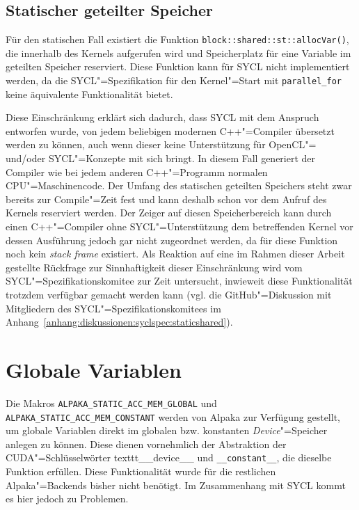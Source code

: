 \subsection{Statischer geteilter Speicher}

Für den statischen Fall existiert die Funktion
\texttt{block::shared::st::allocVar()}, die innerhalb des Kernels aufgerufen
wird und Speicherplatz für eine Variable im geteilten Speicher reserviert. Diese
Funktion kann für SYCL nicht implementiert werden, da die SYCL"=Spezifikation
für den Kernel"=Start mit \texttt{parallel\_for} keine äquivalente
Funktionalität bietet.

Diese Einschränkung erklärt sich dadurch, dass SYCL mit dem Anspruch entworfen
wurde, von jedem beliebigen modernen C++"=Compiler übersetzt werden zu können,
auch wenn dieser keine Unterstützung für OpenCL"= und/oder SYCL"=Konzepte mit
sich bringt. In diesem Fall generiert der Compiler wie bei jedem anderen
C++"=Programm normalen CPU"=Maschinencode. Der Umfang des statischen geteilten
Speichers steht zwar bereits zur Compile"=Zeit fest und kann deshalb schon vor
dem Aufruf des Kernels reserviert werden. Der Zeiger auf diesen Speicherbereich
kann durch einen C++"=Compiler ohne SYCL"=Unterstützung dem betreffenden Kernel
vor dessen Ausführung jedoch gar nicht zugeordnet werden, da für diese Funktion
noch kein \textit{stack frame} existiert. Als Reaktion auf eine im Rahmen dieser
Arbeit gestellte Rückfrage zur Sinnhaftigkeit dieser Einschränkung wird vom
SYCL"=Spezifikationskomitee zur Zeit untersucht, inwieweit diese Funktionalität
trotzdem verfügbar gemacht werden kann (vgl. die GitHub"=Diskussion mit
Mitgliedern des SYCL"=Spezifikationskomitees im
Anhang~\ref{anhang:diskussionen:syclspec:staticshared}).

\section{Globale Variablen}\label{implementierung:globalvar}

Die Makros \texttt{ALPAKA\_STATIC\_ACC\_MEM\_GLOBAL} und
\texttt{ALPAKA\_STATIC\_ACC\_MEM\_CONSTANT} werden von Alpaka zur Verfügung
gestellt, um globale Variablen direkt im globalen bzw. konstanten
\textit{Device}"=Speicher anlegen zu können. Diese dienen vornehmlich der
Abstraktion der CUDA"=Schlüsselwörter texttt{\_\_device\_\_} und
\texttt{\_\_constant\_\_}, die dieselbe Funktion erfüllen. Diese Funktionalität
wurde für die restlichen Alpaka"=Backends bisher nicht benötigt. Im Zusammenhang
mit SYCL kommt es hier jedoch zu Problemen.

